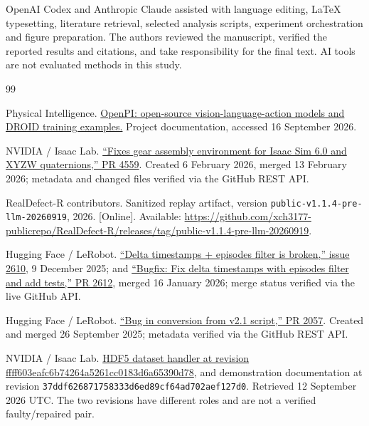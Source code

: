 \documentclass[conference]{IEEEtran}
\begin{document}
OpenAI Codex and Anthropic Claude assisted with language editing, LaTeX typesetting, literature retrieval, selected analysis scripts, experiment orchestration and figure preparation. The authors reviewed the manuscript, verified the reported results and citations, and take responsibility for the final text. AI tools are not evaluated methods in this study.\par

\FloatBarrier

\begin{thebibliography}{99}

 Physical Intelligence. \href{https://github.com/Physical-Intelligence/openpi}{OpenPI: open-source vision-language-action models and DROID training examples.} Project documentation, accessed 16 September 2026.

 NVIDIA / Isaac Lab. \href{https://github.com/isaac-sim/IsaacLab/pull/4559}{“Fixes gear assembly environment for Isaac Sim 6.0 and XYZW quaternions,” PR 4559}. Created 6 February 2026, merged 13 February 2026; metadata and changed files verified via the GitHub REST API.

 \mbox{RealDefect-R} contributors. Sanitized replay artifact, version \texttt{public-v1.1.4-pre-llm-20260919}, 2026. [Online]. Available: \url{https://github.com/xch3177-publicrepo/RealDefect-R/releases/tag/public-v1.1.4-pre-llm-20260919}.

 Hugging Face / LeRobot. \href{https://github.com/huggingface/lerobot/issues/2610}{“Delta timestamps + episodes filter is broken,” issue 2610}, 9 December 2025; and \href{https://github.com/huggingface/lerobot/pull/2612}{“Bugfix: Fix delta timestamps with episodes filter and add tests,” PR 2612}, merged 16 January 2026; merge status verified via the live GitHub API.

 Hugging Face / LeRobot. \href{https://github.com/huggingface/lerobot/pull/2057}{“Bug in conversion from v2.1 script,” PR 2057}. Created and merged 26 September 2025; metadata verified via the GitHub REST API.

 NVIDIA / Isaac Lab. \href{https://github.com/isaac-sim/IsaacLab/blob/ffff603eafc6b74264a5261cc0183d6a65390d78/source/isaaclab/isaaclab/utils/datasets/hdf5_dataset_file_handler.py\#L285-L351}{HDF5 dataset handler at revision ffff603eafc6\allowbreak{}b74264a5261c\allowbreak{}c0183d6a6539\allowbreak{}0d78}, and demonstration documentation at revision \texttt{37ddf6268717\allowbreak{}58333d6ed89c\allowbreak{}f64ad702aef1\allowbreak{}27d0}. Retrieved 12 September 2026 UTC. The two revisions have different roles and are not a verified faulty/repaired pair.


\end{thebibliography}
\end{document}
